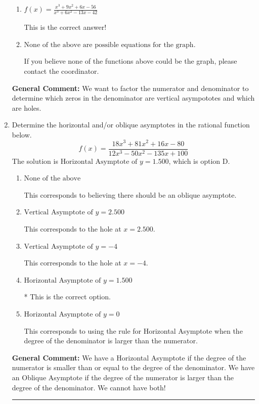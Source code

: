 \documentclass{extbook}[14pt]
\newcommand{\litem}[1]{\item #1

\rule{\textwidth}{0.4pt}}
\begin{document}
\begin{enumerate}
{\begin{enumerate}[label=\Alph*.]
You treated all of the zeros in the denominator as vertical asmptotes when some of them were holes and wrote factors as $x+z$.
\item \( f(x)=\frac{x^{3} +9 x^{2} +6 x -56}{x^{3} +6 x^{2} -13 x -42} \)

This is the correct answer!
\item \( \text{None of the above are possible equations for the graph.} \)

If you believe none of the functions above could be the graph, please contact the coordinator.
\end{enumerate}

\textbf{General Comment:} We want to factor the numerator and denominator to determine which zeros in the denominator are vertical asympototes and which are holes.
}
\litem{
Determine the horizontal and/or oblique asymptotes in the rational function below.
\[ f(x) = \frac{18x^{3} +81 x^{2} +16 x -80}{12x^{3} -50 x^{2} -135 x + 100} \]The solution is \( \text{Horizontal Asymptote of } y = 1.500  \), which is option D.\begin{enumerate}[label=\Alph*.]
\item \( \text{None of the above} \)

This corresponds to believing there should be an oblique asymptote.
\item \( \text{Vertical Asymptote of } y = 2.500  \)

This corresponds to the hole at $x = 2.500$.
\item \( \text{Vertical Asymptote of } y = -4  \)

This corresponds to the hole at $x = -4$.
\item \( \text{Horizontal Asymptote of } y = 1.500  \)

* This is the correct option.
\item \( \text{Horizontal Asymptote of } y = 0  \)

This corresponds to using the rule for Horizontal Asymptote when the degree of the denominator is larger than the numerator.
\end{enumerate}

\textbf{General Comment:} We have a Horizontal Asymptote if the degree of the numerator is smaller than or equal to the degree of the denominator. We have an Oblique Asymptote if the degree of the numerator is larger than the degree of the denominator. We cannot have both!
}
\end{enumerate}
\end{document}
